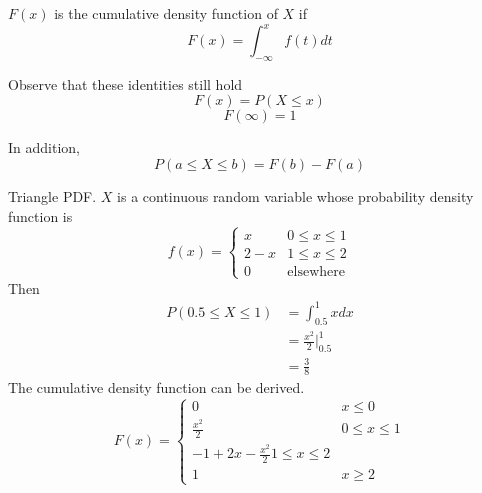 \documentclass[12pt]{article}
\begin{document}
\begin{defn}
	$F(x)$ is the cumulative density function of $X$ if
	$$F(x) = \int_{-\infty}^x f(t)dt$$
\end{defn}

Observe that these identities still hold
$$F(x)=P(X\leq x)$$
$$F(\infty) = 1$$

In addition,
$$P(a\leq X\leq b) = F(b) - F(a)$$

\begin{ex}
	Triangle PDF. $X$ is a continuous random variable whose probability density function is
	$$f(x) = \begin{cases} x & 0 \leq x \leq 1 \\ 2-x & 1\leq x \leq 2 \\ 0 & \text{elsewhere}\end{cases}$$
	Then
	\begin{align*}
		P(0.5\leq X\leq 1) &= \int_{0.5}^1 xdx \\
				   &= \frac{x^2}{2} \Big |_{0.5}^1 \\
				   &= \frac{3}{8}
	\end{align*}
	The cumulative density function can be derived.
	$$F(x) = \begin{cases} 0 & x\leq 0 \\ \frac{x^2}{2} & 0\leq x\leq 1 \\ -1 + 2x - \frac{x^2}{2} 1\leq x\leq 2 \\ 1 & x\geq 2\end{cases}$$
\end{ex}
\end{document}
